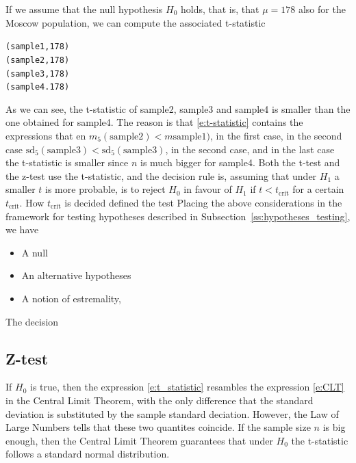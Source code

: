 If we assume that the null hypothesis $H_0$ holds, that is, that $\mu = 178 $ also for the Moscow population, we can compute the associated t-statistic 

\begin{knitrout}
\color{fgcolor}\begin{kframe}
\begin{alltt}
( sample1, 178) 
(sample2, 178) 
(sample3, 178)
(sample4. 178)
\end{alltt}


{\ttfamily\noindent\bfseries{}}\end{kframe}
\end{knitrout}

As we can see, the t-statistic of \textrm{sample2}, \textrm{sample3}  and \textrm{sample4} is smaller than the one obtained for \textrm{sample4}. The reason is that \eqref{e:t-statistic} contains the expressions that en $m_5(\textrm{sample2}) < m\textrm{sample1})$, in the first case, in the second case $\text{sd}_5 (\textrm{sample3}) <\text{sd}_5 (\textrm{sample3})$, in the second case, and in the last case the t-statistic is smaller since $n$  is much bigger for \textrm{sample4}.   
Both the t-test and the z-test use the t-statistic, and the decision rule is, assuming that under $H_1$ a smaller $t$ is more probable, is to reject $H_0$ in favour of $H_1$ if $t < t_{\text{crit}}$ for a certain $ t_{\text{crit}}$. How $t_{\text{crit}}$ is decided defined the test
      Placing the above considerations in the framework for testing hypotheses described in Subsection~\ref{ss:hypotheses_testing}, we have 
      
      \begin{itemize}
		\item A null 
		\item An alternative hypotheses
		\item A notion of estremality, 
	\end{itemize}
	The decision


      \subsection{Z-test}
      If $H_0$ is true, then the expression \eqref{e:t_statistic} resambles the expression \eqref{e:CLT} in the Central Limit Theorem, with the only difference that the standard deviation is substituted by the sample standard deciation. However, the Law of Large Numbers tells that these two quantites coincide. If the sample size $n$ is big enough, then the Central Limit Theorem guarantees that under $H_0$ the t-statistic follows a standard normal distribution. 

